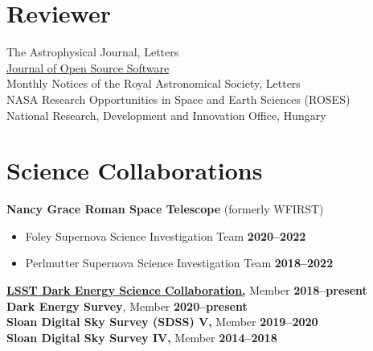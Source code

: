 \documentclass[margin]{res}
\begin{document}
\begin{resume}
\begin{comment}
year |   Fall        | Spring        | Summer
1st  | Labs-premed   | labs-eng      | labs-premed
2nd  | Labs-eng      | RA            | RA
3rd  | RA/IntroAstro | Peter's intro | RA
4th  | IntroAstro    | Python        | RA
5th  | Physics C HW  | RA            | RA & REU classes
6th  | Fellowship (GRE Class) | Python | NA!?!
\end{comment}






\section{Reviewer}

The Astrophysical Journal, Letters \\ %
\href{https://github.com/openjournals/joss-reviews/issues?utf8=✓&q=is\%3Aissue+benjaminrose+label\%3Areview}{Journal of Open Source Software} \\ 
Monthly Notices of the Royal Astronomical Society, Letters
\\ %
NASA Research Opportunities in Space and Earth Sciences (ROSES) \\
National Research, Development and Innovation Office, Hungary





\section{Science Collaborations}
{\bf Nancy Grace Roman Space Telescope} (formerly WFIRST)
\begin{itemize}\itemsep -2pt
 \item[] Foley Supernova Science Investigation Team \hfill {\bf 2020--2022}
 \item[] Perlmutter Supernova Science Investigation Team \hfill {\bf 2018--2022}
\end{itemize} \vspace{-12pt}
{\bf \href{http://www.lsst-desc.org}{LSST Dark Energy Science Collaboration,}} Member \hfill {\bf 2018--present}
\\
{\bf Dark Energy Survey}, Member \hfill {\bf 2020--present}\\
{\bf Sloan Digital Sky Survey (SDSS) V,} Member \hfill {\bf 2019--2020}\\
{\bf Sloan Digital Sky Survey IV,} Member \hfill {\bf 2014--2018}






\end{resume}
\end{document}
